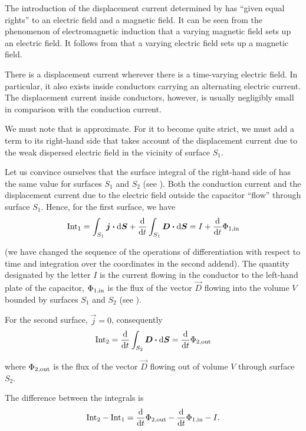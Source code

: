 The introduction of the displacement current determined by  has ``given equal rights'' to an electric field and a magnetic field.
It can be seen from the phenomenon of electromagnetic induction that a varying magnetic field sets up an electric field.
It follows from  that a varying electric field sets up a magnetic field.

There is a displacement current wherever there is a time-varying electric field.
In particular, it also exists inside conductors carrying an alternating electric current.
The displacement current inside conductors, however, is usually negligibly small in comparison with the conduction current.

We must note that  is approximate.
For it to become quite strict, we must add a term to its right-hand side that takes account of the displacement current due to the weak dispersed electric field in the vicinity of surface $S_1$.

Let us convince ourselves that the surface integral of the right-hand side of  has the same value for surfaces $S_1$ and $S_2$ (see ).
Both the conduction current and the displacement current due to the electric field outside the capacitor ``flow'' through surface $S_1$.
Hence, for the first surface, we have
\begin{equation*}
    \text{Int}_1 = \int_{S_1} \boldsymbol{j} \boldsymbol{\cdot} \mathrm{d}\boldsymbol{S} + \dfrac{\mathrm{d}}{\mathrm{d} t} \int_{S_1} \boldsymbol{D} \boldsymbol{\cdot} \mathrm{d}\boldsymbol{S} = I + \dfrac{\mathrm{d}}{\mathrm{d} t} \Phi_{\text{$1$,in}}
\end{equation*}

\noindent
(we have changed the sequence of the operations of differentiation with respect to time and integration over the coordinates in the second addend).
The quantity designated by the letter $I$ is the current flowing in the conductor to the left-hand plate of the capacitor, $\Phi_{\text{$1$,in}}$ is the flux of the vector $\vec{D}$ flowing into the volume $V$ bounded by surfaces $S_1$ and $S_2$ (see ).

For the second surface, $\vec{j}=0$, consequently
\begin{equation*}
    \text{Int}_2 = \dfrac{\mathrm{d}}{\mathrm{d} t} \int_{S_2} \boldsymbol{D} \boldsymbol{\cdot} \mathrm{d}\boldsymbol{S} = \dfrac{\mathrm{d}}{\mathrm{d} t} \Phi_{\text{$2$,out}}
\end{equation*}

\noindent
where $\Phi_{\text{$2$,out}}$ is the flux of the vector $\vec{D}$ flowing out of volume $V$ through surface $S_2$.

The difference between the integrals is
\begin{equation*}
    \text{Int}_2 - \text{Int}_1 = \dfrac{\mathrm{d}}{\mathrm{d} t} \Phi_{\text{$2$,out}} - \dfrac{\mathrm{d}}{\mathrm{d} t} \Phi_{\text{$1$,in}} - I.
\end{equation*}

